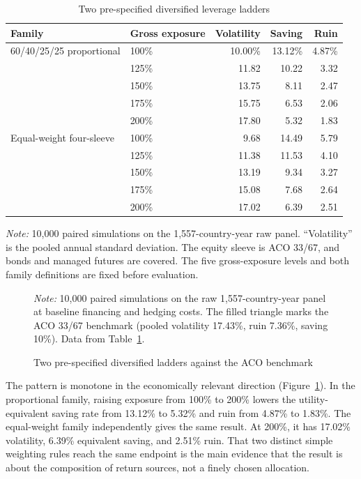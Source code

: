 \documentclass[11pt]{article}
\begin{document}
\begin{table}[t]
\centering
\caption{Two pre-specified diversified leverage ladders}
\label{tab:main-ladders}
\setlength{\tabcolsep}{3pt}
\small
\begin{tabular}{llrrr}
\toprule
Family & Gross exposure & Volatility & Saving & Ruin \\
\midrule
60/40/25/25 proportional & 100\% & 10.00\% & 13.12\% & 4.87\% \\
 & 125\% & 11.82 & 10.22 & 3.32 \\
 & 150\% & 13.75 & 8.11 & 2.47 \\
 & 175\% & 15.75 & 6.53 & 2.06 \\
 & 200\% & 17.80 & 5.32 & 1.83 \\
\addlinespace
Equal-weight four-sleeve & 100\% & 9.68 & 14.49 & 5.79 \\
 & 125\% & 11.38 & 11.53 & 4.10 \\
 & 150\% & 13.19 & 9.34 & 3.27 \\
 & 175\% & 15.08 & 7.68 & 2.64 \\
 & 200\% & 17.02 & 6.39 & 2.51 \\
\bottomrule
\end{tabular}
\begin{minipage}{0.95\textwidth}\footnotesize
\textit{Note:} 10,000 paired simulations on the 1{,}557-country-year raw
panel. ``Volatility'' is the pooled annual standard deviation. The equity sleeve
is ACO 33/67, and bonds and managed futures are covered. The five gross-exposure
levels and both family definitions are fixed before evaluation.
\end{minipage}
\end{table}

\begin{figure}[t]
\centering

\caption{Two pre-specified diversified ladders against the ACO benchmark}
\label{fig:ladders-main}
\begin{minipage}{0.9\textwidth}\footnotesize
\textit{Note:} 10,000 paired simulations on the raw 1,557-country-year panel at
baseline financing and hedging costs. The filled triangle marks the ACO 33/67
benchmark (pooled volatility 17.43\%, ruin 7.36\%, saving 10\%). Data from
Table~\ref{tab:main-ladders}.
\end{minipage}
\end{figure}

The pattern is monotone in the economically relevant direction
(Figure~\ref{fig:ladders-main}). In the
proportional family, raising exposure from 100\% to 200\% lowers the
utility-equivalent saving rate from 13.12\% to 5.32\% and ruin from 4.87\% to
1.83\%. The equal-weight family independently gives the same result. At 200\%,
it has 17.02\% volatility, 6.39\% equivalent saving, and 2.51\% ruin. That two
distinct simple weighting rules reach the same endpoint is the main evidence
that the result is about the composition of return sources, not a finely chosen
allocation.
\end{document}
